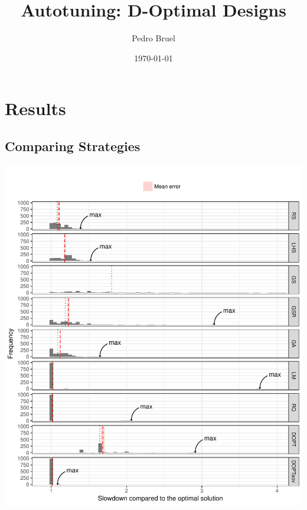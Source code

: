 \documentclass[final,12pt,a4paper]{article}
\author{Pedro Bruel}
\date{\today}
\title{Autotuning: D-Optimal Designs}
\begin{document}
\maketitle
\tableofcontents


\section{Results}
\label{sec:orge42ea71}
\subsection{Comparing Strategies}
\label{sec:org8051c3e}
\begin{center}
\includegraphics[width=.9\linewidth]{../img/comparison_histogram.pdf}
\end{center}
\end{document}
